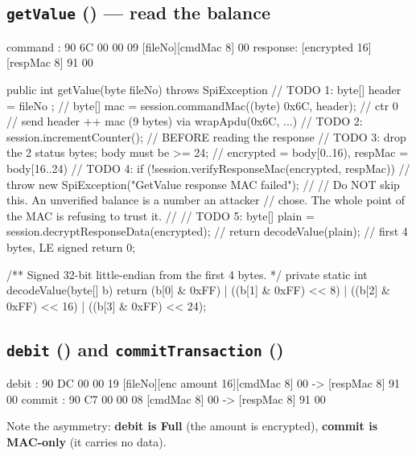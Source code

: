 \subsection{\texttt{getValue} () --- read the balance}

\begin{trace}
command : 90 6C 00 00 09 [fileNo][cmdMac 8] 00
response: [encrypted 16][respMac 8] 91 00
\end{trace}

\begin{jcode}
    public int getValue(byte fileNo) throws SpiException {
        // TODO 1: byte[] header = { fileNo };
        //         byte[] mac = session.commandMac((byte) 0x6C, header);  // ctr 0
        //         send header ++ mac (9 bytes) via wrapApdu(0x6C, ...)
        // TODO 2: session.incrementCounter();   // BEFORE reading the response
        // TODO 3: drop the 2 status bytes; body must be >= 24;
        //         encrypted = body[0..16), respMac = body[16..24)
        // TODO 4: if (!session.verifyResponseMac(encrypted, respMac))
        //             throw new SpiException("GetValue response MAC failed");
        //
        //   Do NOT skip this. An unverified balance is a number an attacker
        //   chose. The whole point of the MAC is refusing to trust it.
        //
        // TODO 5: byte[] plain = session.decryptResponseData(encrypted);
        //         return decodeValue(plain);    // first 4 bytes, LE signed
        return 0;
    }

    /** Signed 32-bit little-endian from the first 4 bytes. */
    private static int decodeValue(byte[] b) {
        return (b[0] & 0xFF) | ((b[1] & 0xFF) << 8)
             | ((b[2] & 0xFF) << 16) | ((b[3] & 0xFF) << 24);
    }
\end{jcode}

\subsection{\texttt{debit} () and \texttt{commitTransaction} ()}

\begin{trace}
debit  : 90 DC 00 00 19 [fileNo][enc amount 16][cmdMac 8] 00  ->  [respMac 8] 91 00
commit : 90 C7 00 00 08 [cmdMac 8] 00                        ->  [respMac 8] 91 00
\end{trace}

Note the asymmetry: \textbf{debit is Full} (the amount is encrypted),
\textbf{commit is MAC-only} (it carries no data).

